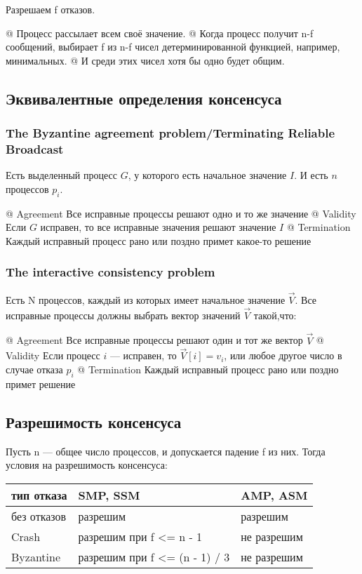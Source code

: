 Разрешаем f отказов. 
\begin{el}[ul]
@ Процесс рассылает всем своё значение.
@ Когда процесс получит n-f сообщений, выбирает f из n-f чисел детерминированной функцией, например, минимальных. 
@ И среди этих чисел хотя бы одно будет общим.
\end{el}

\subsection{Эквивалентные определения консенсуса}
\subsubsection{The Byzantine agreement problem/Terminating Reliable Broadcast}
Есть выделенный процесс $G$, у которого есть начальное значение $I$. И есть $n$ процессов $p_i$.
\begin{el}[ul]
@ Agreement Все исправные процессы решают одно и то же
значение
@ Validity Если $G$ исправен, то все исправные значения решают
значение $I$
@ Termination Каждый исправный процесс рано или поздно примет
какое-то решение
\end{el}

\subsubsection{The interactive consistency problem}
Есть N процессов, каждый из которых имеет начальное значение $\vec{V}$.
Все исправные процессы должны выбрать вектор значений $\vec{V}$ такой,что:
\begin{el}[ul]
@ Agreement Все исправные процессы решают один и тот же вектор $\vec{V}$
@ Validity Если процесс $i$ — исправен, то $\vec{V}[i] = v_i$, или любое другое число в случае отказа $p_i$
@ Termination Каждый исправный процесс рано или поздно примет решение
\end{el}

\subsection{Разрешимость консенсуса}
Пусть n — общее число процессов, и допускается падение f из них. Тогда условия на разрешимость консенсуса:

\begin{tabular}{|l|l|l|}
\hline
тип отказа & SMP, SSM & AMP, ASM \\ \hline
без отказов & разрешим & разрешим \\ \hline
Crash & разрешим при f <= n - 1 & не разрешим \\ \hline
Byzantine & разрешим при f <= (n - 1) / 3 & не разрешим \\ \hline
\end{tabular}

